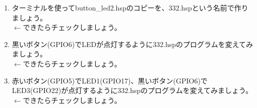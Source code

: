 \begin{tcolorbox}[title=\useOmetoi]
\label{button_led2_toi}
\begin{enumerate}
\item ターミナルを使ってbutton\_led2.hspのコピーを、332.hspという名前で作りましょう。\\
\fbox{\phantom{白}} $\leftarrow$できたらチェックしましょう。
\item 黒いボタン(GPIO6)でLEDが点灯するように332.hspのプログラムを変えてみましょう。\\
\fbox{\phantom{白}} $\leftarrow$できたらチェックしましょう。
\item 赤いボタン(GPIO5)でLED1(GPIO17)、黒いボタン(GPIO6)でLED3(GPIO22)が点灯するように332.hspのプログラムを変えてみましょう。\\
\fbox{\phantom{白}} $\leftarrow$できたらチェックしましょう。
\end{enumerate}
\end{tcolorbox}
